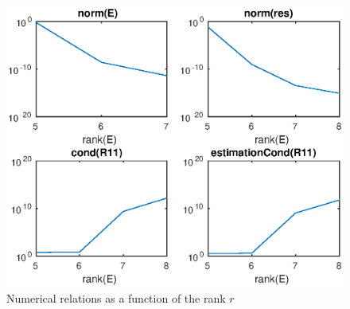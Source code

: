 \begin{figure}
\begin{center}
\includegraphics[scale=0.7]{qrPlot.eps}
\caption{Numerical relations as a function of the rank $r$}
\label{lsp}
\end{center}
\end{figure}

\FloatBarrier







